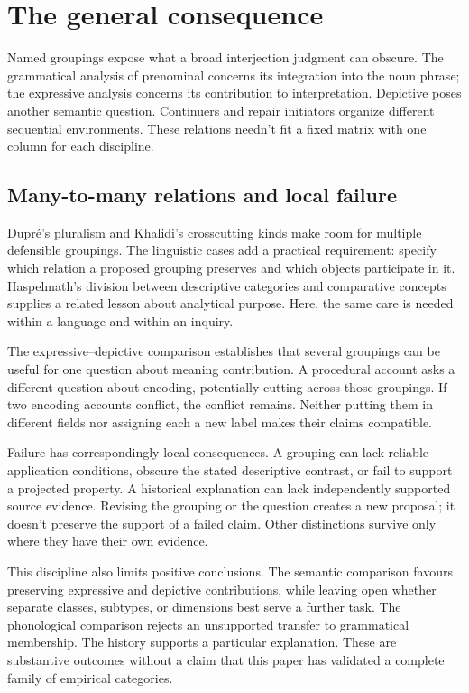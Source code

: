 \documentclass[12pt]{article}
\begin{document}
\section{The general consequence}\label{sec:discussion}

Named groupings expose what a broad interjection judgment can obscure.
The grammatical analysis of prenominal  concerns its
integration into the noun phrase; the expressive analysis concerns
its contribution to interpretation. Depictive  poses
another semantic question. Continuers and repair initiators organize
different sequential environments. These relations needn't fit a
fixed matrix with one column for each discipline.

\subsection{Many-to-many relations and local failure}

Dupr\'e's pluralism and Khalidi's crosscutting kinds make room for
multiple defensible groupings. The linguistic cases add a practical
requirement: specify which relation a proposed grouping preserves and
which objects participate in it. Haspelmath's division between descriptive
categories and comparative concepts supplies a related lesson about
analytical purpose. Here, the same care is needed within a language
and within an inquiry.

The expressive--depictive comparison establishes that several groupings
can be useful for one question about meaning contribution. A procedural
account asks a different question about encoding, potentially cutting
across those groupings. If two encoding accounts conflict,
the conflict remains. Neither putting them in different fields nor
assigning each a new label makes their claims compatible.

Failure has correspondingly local consequences. A grouping can lack
reliable application conditions, obscure the stated descriptive contrast,
or fail to support a projected property. A historical explanation can
lack independently supported source evidence. Revising the grouping or
the question creates a new proposal; it doesn't preserve the support
of a failed claim. Other distinctions survive only where they have
their own evidence.

This discipline also limits positive conclusions. The semantic comparison
favours preserving expressive and depictive contributions, while leaving
open whether separate classes, subtypes, or dimensions best serve a
further task. The phonological comparison rejects an unsupported transfer
to grammatical membership. The  history supports a particular
explanation. These are substantive outcomes without a claim that this
paper has validated a complete family of empirical categories.
\end{document}
